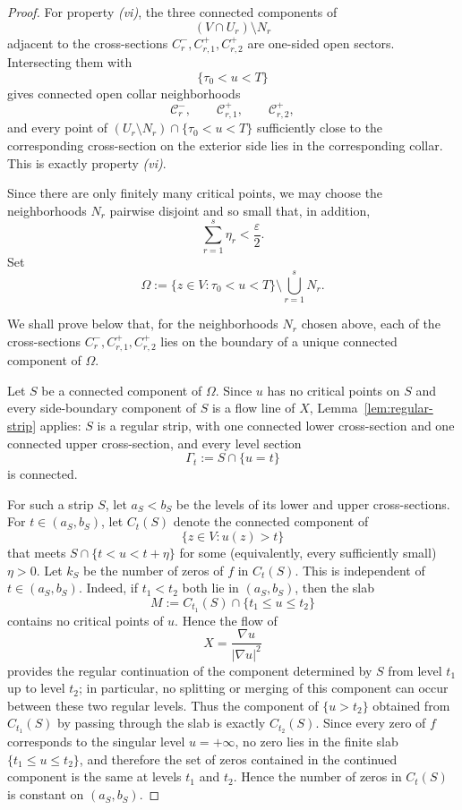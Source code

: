 \documentclass[12pt]{amsart}
\theoremstyle{definition}
\theoremstyle{remark}
\begin{document}
\begin{proof}
For property \emph{(vi)}, the three connected components of
\[
(V\cap U_r)\setminus N_r
\]
adjacent to the cross-sections $C_r^-, C_{r,1}^+, C_{r,2}^+$ are one-sided open sectors.
Intersecting them with
\[
\{\tau_0<u<T\}
\]
gives connected open collar neighborhoods
\[
\mathcal C_r^-,
\qquad
\mathcal C_{r,1}^+,
\qquad
\mathcal C_{r,2}^+,
\]
and every point of $(U_r\setminus N_r)\cap\{\tau_0<u<T\}$ sufficiently close to the corresponding
cross-section on the exterior side lies in the corresponding collar. This is exactly property \emph{(vi)}.

Since there are only finitely many critical points, we may choose the neighborhoods $N_r$ pairwise
disjoint and so small that, in addition,
\[
\sum_{r=1}^s \eta_r<\frac{\varepsilon}{2}.
\]
Set
\[
\Omega:=\{z\in V:\tau_0<u<T\}\setminus \bigcup_{r=1}^s N_r.
\]

We shall prove below that, for the neighborhoods $N_r$ chosen above, each of the cross-sections $C_r^{-}, C_{r,1}^{+}, C_{r,2}^{+}$
lies on the boundary of a unique connected component of $\Omega$.

Let $S$ be a connected component of $\Omega$. Since $u$ has no critical points on $S$ and every side-boundary
component of $S$ is a flow line of $X$, Lemma~\ref{lem:regular-strip} applies: $S$ is a regular strip, with one connected lower
cross-section and one connected upper cross-section, and every level section
\[
\Gamma_t:=S\cap\{u=t\}
\]
is connected.

\indent For such a strip $S$, let $a_S<b_S$ be the levels of its lower and upper cross-sections.
For $t\in(a_S,b_S)$, let $C_t(S)$ denote the connected component of
\[
\{z\in V:u(z)>t\}
\]
that meets $S\cap\{t<u<t+\eta\}$ for some (equivalently, every sufficiently small)
$\eta>0$. Let $k_S$ be the number of zeros of $f$ in $C_t(S)$. This is independent of
$t\in(a_S,b_S)$. Indeed, if $t_1<t_2$ both lie in $(a_S,b_S)$, then the slab
\[
M:=C_{t_1}(S)\cap\{t_1\le u\le t_2\}
\]
contains no critical points of $u$. Hence the flow of
\[
X=\frac{\nabla u}{|\nabla u|^2}
\]
provides the regular continuation of the component determined by $S$ from level $t_1$ up to level $t_2$; in particular, no splitting or merging of this component can occur between these two regular levels. Thus the component of $\{u>t_2\}$ obtained from $C_{t_1}(S)$ by passing through the slab is exactly $C_{t_2}(S)$. Since every zero of $f$ corresponds to the singular level $u=+\infty$, no zero lies in the finite slab $\{t_1\le u\le t_2\}$, and therefore the set of zeros contained in the continued component is the same at levels $t_1$ and $t_2$. Hence the number of zeros in $C_t(S)$ is constant on $(a_S,b_S)$.


\end{proof}
\end{document}
